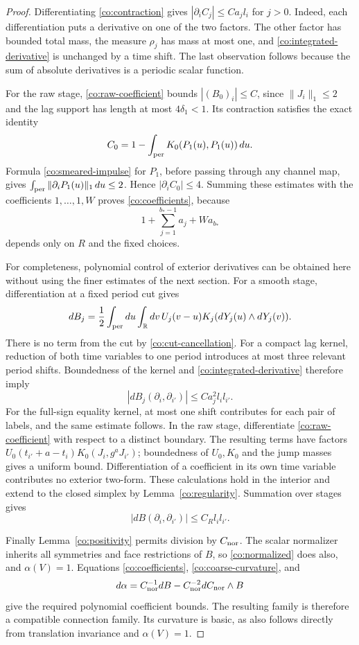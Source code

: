 \begin{proof}
Differentiating \eqref{co:contraction} gives
$|\partial_iC_j|\leq Ca_jl_i$ for $j>0$.  Indeed, each differentiation
puts a derivative on one of the two factors.  The other factor has
bounded total mass, the measure $\rho_j$ has mass at most one, and
\eqref{co:integrated-derivative} is unchanged by a time shift.  The last
observation follows because the sum of absolute derivatives is a
periodic scalar function.

For the raw stage, \eqref{co:raw-coefficient} bounds
$|(B_0)_i|\leq C$, since $\|J_i\|_1\leq2$ and the lag support has length
at most $4\delta_1<1$.  Its contraction satisfies the exact identity
\[
 C_0=1-\int_{\rm per}K_0(P_1(u),P_1(u))\,du.
\]
Formula \eqref{co:smeared-impulse} for $P_1$, before passing through any
channel map, gives
$\int_{\rm per}\|\partial_iP_1(u)\|_1\,du\leq2$.
Hence $|\partial_iC_0|\leq4$.  Summing these estimates with the
coefficients $1,\ldots,1,W$ proves \eqref{co:coefficients}, because
\[
 1+\sum_{j=1}^{b_*-1}a_j+Wa_{b_*}
\]
depends only on $R$ and the fixed choices.

For completeness, polynomial control of exterior derivatives can be
obtained here without using the finer estimates of the next section.
For a smooth stage, differentiation at a fixed period cut gives
\begin{equation}
 dB_j=\frac12\int_{\rm per}du\int_{\mathbb R}dv\,
          U_j(v-u)K_j(dY_j(u)\wedge dY_j(v)).
 \label{co:exterior-pairing}
\end{equation}
There is no term from the cut by \eqref{co:cut-cancellation}.  For a
compact lag kernel, reduction of both time variables to one period
introduces at most three relevant period shifts.  Boundedness of the
kernel and \eqref{co:integrated-derivative} therefore imply
\[
 |dB_j(\partial_i,\partial_{i'})|
 \leq Ca_j^2l_il_{i'}.
\]
For the full-sign equality kernel, at most one shift contributes for
each pair of labels, and the same estimate follows.  In the raw stage,
differentiate \eqref{co:raw-coefficient} with respect to a distinct
boundary.  The resulting terms have factors
$U_0(t_{i'}+a-t_i)K_0(J_i,g^aJ_{i'})$; boundedness of $U_0,K_0$ and the
jump masses gives a uniform bound.  Differentiation of a coefficient in
its own time variable contributes no exterior two-form.  These
calculations hold in the interior and extend to the closed simplex by
Lemma~\ref{co:regularity}.  Summation over stages gives
\begin{equation}
 |dB(\partial_i,\partial_{i'})|\leq C_Rl_il_{i'}.
 \label{co:coarse-curvature}
\end{equation}

Finally Lemma~\ref{co:positivity} permits division by $C_{\rm nor}$.
The scalar normalizer inherits all symmetries and face restrictions of
$B$, so \eqref{co:normalized} does also, and $\alpha(V)=1$.
Equations \eqref{co:coefficients}, \eqref{co:coarse-curvature}, and
\[
 d\alpha=C_{\rm nor}^{-1}dB
          -C_{\rm nor}^{-2}dC_{\rm nor}\wedge B
\]
give the required polynomial coefficient bounds.  The resulting family
is therefore a compatible connection family.  Its curvature is basic, as
also follows directly from translation invariance and $\alpha(V)=1$.
\end{proof}

